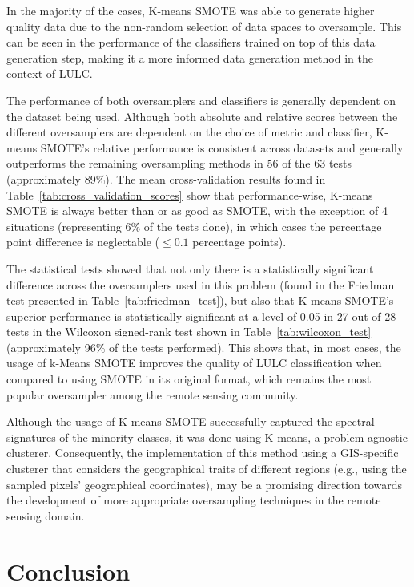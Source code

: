 \documentclass[authoryear,preprint,12pt]{elsarticle}
\begin{document}
\begin{linenumbers}
In the majority of the cases, K-means SMOTE was able to generate higher
quality data due to the non-random selection of data spaces to oversample.
This can be seen in the performance of the classifiers trained on top of this
data generation step, making it a more informed data generation method in the
context of LULC\@.

The performance of both oversamplers and classifiers is generally dependent on
the dataset being used. Although both absolute and relative scores between the
different oversamplers are dependent on the choice of metric and classifier,
K-means SMOTE's relative performance is consistent across datasets and
generally outperforms the remaining oversampling methods in 56 of the 63 tests
(approximately 89\%). The mean cross-validation results found in
Table~\ref{tab:cross_validation_scores} show that performance-wise, K-means
SMOTE is always better than or as good as SMOTE, with the exception of 4
situations (representing 6\% of the tests done), in which cases the percentage
point difference is neglectable ($\leq 0.1$ percentage points). 

The statistical tests showed that not only there is a statistically
significant difference across the oversamplers used in this problem (found in
the Friedman test presented in Table~\ref{tab:friedman_test}), but also that
K-means SMOTE's superior performance is statistically significant at a level
of 0.05 in 27 out of 28 tests in the Wilcoxon signed-rank test shown in
Table~\ref{tab:wilcoxon_test} (approximately 96\% of the tests performed).
This shows that, in most cases, the usage of k-Means SMOTE improves the
quality of LULC classification when compared to using SMOTE in its original
format, which remains the most popular oversampler among the remote sensing
community.

Although the usage of K-means SMOTE successfully captured the spectral
signatures of the minority classes, it was done using K-means, a
problem-agnostic clusterer. Consequently, the implementation of this method
using a GIS-specific clusterer that considers the geographical traits of
different regions (e.g., using the sampled pixels' geographical coordinates),
may be a promising direction towards the development of more appropriate
oversampling techniques in the remote sensing domain.

\section{Conclusion}~\label{sec:conclusion} 


\end{linenumbers}
\end{document}
